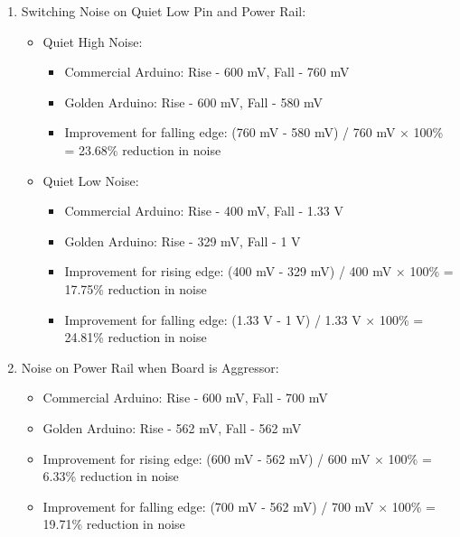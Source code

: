 \documentclass[a4paper,11pt]{article}%
\begin{document}
\begin{enumerate}
	\item Switching Noise on Quiet Low Pin and Power Rail:\
	\begin{itemize}
		\item Quiet High Noise:
		\begin{itemize}
			\item Commercial Arduino: Rise - 600 mV, Fall - 760 mV
			\item Golden Arduino: Rise - 600 mV, Fall - 580 mV
			\item Improvement for falling edge: (760 mV - 580 mV) / 760 mV × 100\% = 23.68\% reduction in noise
			
		\end{itemize}
		\item Quiet Low Noise:
		\begin{itemize}
			\item Commercial Arduino: Rise - 400 mV, Fall - 1.33 V
			\item Golden Arduino: Rise - 329 mV, Fall - 1 V
			\item Improvement for rising edge: (400 mV - 329 mV) / 400 mV × 100\% = 17.75\% reduction in noise
			\item Improvement for falling edge: (1.33 V - 1 V) / 1.33 V × 100\% = 24.81\% reduction in noise
		\end{itemize}
			
		
	\end{itemize}
	
	
	\item Noise on Power Rail when Board is Aggressor:
	\begin{itemize}
		\item Commercial Arduino: Rise - 600 mV, Fall - 700 mV
		\item Golden Arduino: Rise - 562 mV, Fall - 562 mV
		\item Improvement for rising edge: (600 mV - 562 mV) / 600 mV × 100\% = 6.33\% reduction in noise
		\item Improvement for falling edge: (700 mV - 562 mV) / 700 mV × 100\% = 19.71\% reduction in noise
	\end{itemize}
	

\end{enumerate}
\end{document}
